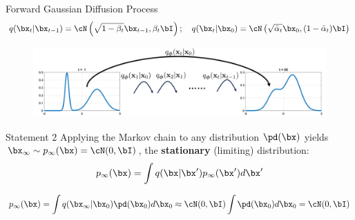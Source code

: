 \documentclass{beamer}
\begin{document}
\begin{frame}{Forward Gaussian Diffusion Process}
	\vspace{-0.3cm}
	{\small
	\[
		q(\bx_t | \bx_{t-1}) = \cN\left(\sqrt{1 - \beta_t} \bx_{t-1}, \beta_t \bI\right); \quad q(\bx_t | \bx_0) = \cN\left(\sqrt{\bar{\alpha}_t} \bx_0, (1 - \bar{\alpha}_t) \bI\right)
	\]
	}
	\vspace{-0.8cm}
	\begin{figure}
		\includegraphics[width=0.8\linewidth]{figs/conditional_diffusion}
	\end{figure}
    \eqpause
	\vspace{-0.5cm}
	\begin{block}{Statement 2}
		Applying the Markov chain to any distribution $\pd(\bx)$ yields $\bx_\infty \sim p_\infty(\bx) = \cN(0, \bI)$, the \textbf{stationary} (limiting) distribution:
		\[
			p_\infty(\bx) = \int q(\bx | \bx') p_\infty(\bx') d\bx' 
		\]

		\vspace{-0.5cm}
        \eqpause
		\[
			p_\infty(\bx) = \int q(\bx_\infty | \bx_0) \pd(\bx_0) d\bx_0 \approx \cN(0, \bI) \int \pd(\bx_0) d\bx_0 = \cN(0, \bI)
		\]
	\end{block}
 \end{frame}
\end{document}
